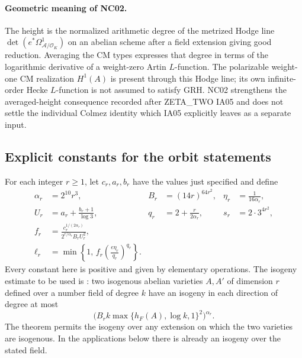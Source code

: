 \documentclass[11pt]{article}
\theoremstyle{remark}
\begin{document}
\paragraph{Geometric meaning of NC02.}
The height is the normalized arithmetic degree of the metrized Hodge
line $\det(e^*\Omega^1_{\mathcal A/\mathcal O_K})$ on an abelian
scheme after a field extension giving good reduction.
Averaging the CM types expresses that degree in terms of the logarithmic
derivative of a weight-zero Artin $L$-function.  The polarizable
weight-one CM realization $H^1(A)$ is present through this Hodge line;
its own infinite-order Hecke $L$-function is not assumed to satisfy GRH.
NC02 strengthens the averaged-height consequence recorded after
ZETA\_TWO IA05 and does not settle the individual Colmez identity
which IA05 explicitly leaves as a separate input.

\subsection{Explicit constants for the orbit statements}

For each integer $r\geq1$, let $c_r,a_r,b_r$ have the values just
specified and define
\begin{align*}
 \alpha_r&=2^{10}r^3,& B_r&=(14r)^{64r^2},&
 \eta_r&=\frac{1}{16\alpha_r},\\
 U_r&=a_r+\frac{b_r+1}{\log3},&
 q_r&=2+\frac{r}{2\alpha_r},&
 s_r&=2\cdot3^{4r^2},\\
 f_r&=\frac{c_r^{1/(2\alpha_r)}}
              {2^{r/\alpha_r}B_rU_r^2},&&&\\
 \ell_r&=\min\left\{1,\,
           f_r\left(\frac{e\eta_r}{q_r}\right)^{q_r}\right\}.&&&
\end{align*}
Every constant here is positive and given by elementary operations.
The isogeny estimate to be used is
\cite[Theorem~1.4, p.~2060; definition of $\kappa(A)$, p.~2058]
{NC-GRPol2014}: two isogenous abelian varieties $A,A'$ of dimension $r$
defined over a number field of degree $k$ have an isogeny in each
direction of degree at most
\begin{equation}\label{eq:NC-GR}
 \bigl(B_rk\max\{h_F(A),\log k,1\}^{2}\bigr)^{\alpha_r}.
\end{equation}
The theorem permits the isogeny over any extension on which the two
varieties are isogenous.  In the applications below there is already
an isogeny over the stated field.
\end{document}
